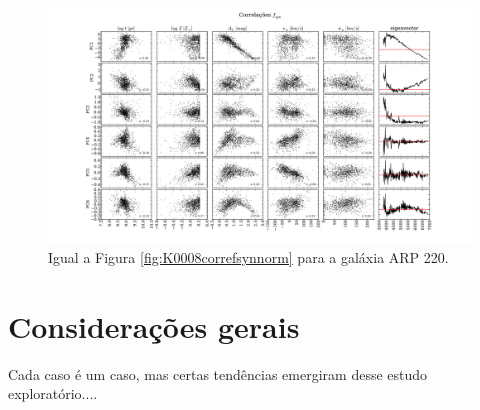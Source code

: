 \begin{figure}
    \includegraphics[width=1.3\textwidth, angle=-90]{figuras/K0802-correl-f_syn_norm-PCvsPhys.pdf}
	\caption[Correlações PCs vs. par\^ametros f\'isicos - $f_{syn}$ - ARP 220.]
	{Igual a Figura \ref{fig:K0008correfsynnorm} para a galáxia ARP 220.}
    \label{fig:K0802correfsynnorm}
\end{figure}

\section{Considerações gerais}

\ojo Cada caso é um caso, mas certas tendências emergiram desse estudo exploratório....

